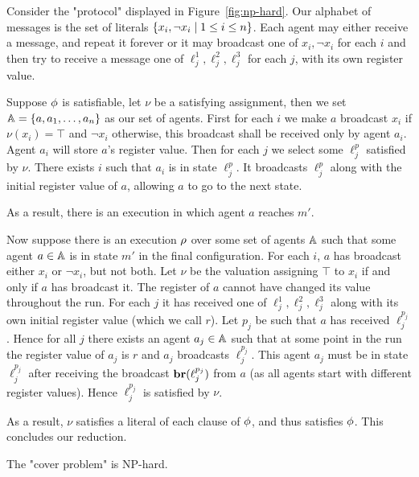 Consider the "protocol" displayed in Figure~\ref{fig:np-hard}.
Our alphabet of messages is the set of literals $\{x_i, \neg x_i \mid 1 \leq i \leq n\}$.
Each agent may either receive a message, and repeat it forever or it may broadcast one of $x_i, \neg x_i$ for each $i$ and then try to receive a message one of $\ell_j^1, \ell_j^2, \ell_j^3$ for each $j$, with its own register value.

Suppose $\phi$ is satisfiable, let $\nu$ be a satisfying assignment, then we set $\mathbb{A} = \{a, a_1, \ldots, a_n\}$ as our set of agents. First for each $i$ we make $a$ broadcast $x_i$ if $\nu(x_i)= \top$ and $\neg x_i$ otherwise, this broadcast shall be received only by agent $a_i$. Agent $a_i$ will store $a$'s register value.
Then for each $j$ we select some $\ell_j^p$ satisfied by $\nu$. There exists $i$ such that $a_i$ is in state $\ell_j^p$. It broadcasts $\ell_j^p$ along with the initial register value of $a$, allowing $a$ to go to the next state.

As a result, there is an execution in which agent $a$ reaches $m'$.

Now suppose there is an execution $\rho$ over some set of agents $\mathbb{A}$ such that some agent $a \in \mathbb{A}$ is in state $m'$ in the final configuration.
For each $i$, $a$ has broadcast either $x_i$ or $\neg x_i$, but not both.
Let $\nu$ be the valuation assigning $\top$ to $x_i$ if and only if $a$ has broadcast it.
The register of $a$ cannot have changed its value throughout the run. 
For each $j$ it has received one of $\ell_j^1, \ell_j^2, \ell_j^3$ along with its own initial register value (which we call $r$). Let $p_j$ be such that $a$ has received $\ell_j^{p_j}$.
Hence for all $j$ there exists an agent $a_j \in \mathbb{A}$ such that at some point in the run the register value of $a_j$ is $r$ and $a_j$ broadcasts $\ell_j^{p_j}$.
This agent $a_j$ must be in state $\ell_j^{p_j}$ after receiving the broadcast $\textbf{br}(\ell_j^{p_j})$ from $a$ (as all agents start with different register values).
Hence $\ell_j^{p_j}$ is satisfied by $\nu$. 

As a result, $\nu$ satisfies a literal of each clause of $\phi$, and thus satisfies $\phi$. This concludes our reduction.


\begin{proposition}
	\label{prop:np-hard-query-cover}
	The "cover problem" is NP-hard.
\end{proposition}

